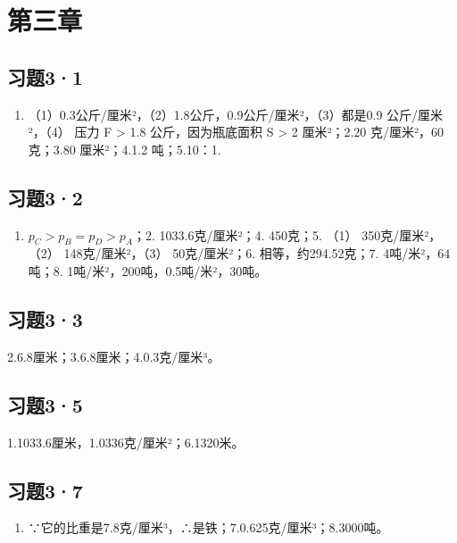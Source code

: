 \section{第三章}\label{ux7b2cux4e09ux7ae0}

\subsection{习题3·1}\label{ux4e60ux989831-1}

\begin{enumerate}
\def\labelenumi{\arabic{enumi}.}
\tightlist
\item
  （1）0.3公斤/厘米²，（2）1.8公斤，0.9公斤/厘米²，（3）都是0.9
  公斤/厘米²，（4） 压力 F \textgreater{} 1.8 公斤，因为瓶底面积 S
  \textgreater{} 2 厘米²；2.20 克/厘米²，60 克；3.80 厘米²；4.1.2
  吨；5.10：1.
\end{enumerate}

\subsection{习题3·2}\label{ux4e60ux989832-1}

\begin{enumerate}
\def\labelenumi{\arabic{enumi}.}
\tightlist
\item
  \(p_C > p_B = p_D > p_A\)；2. 1033.6克/厘米²；4. 450克；5. （1）
  350克/厘米²，（2） 148克/厘米²，（3） 50克/厘米²；6.
  相等，约294.52克；7. 4吨/米²，64吨；8.
  1吨/米²，200吨，0.5吨/米²，30吨。
\end{enumerate}

\subsection{习题3·3}\label{ux4e60ux989833-1}

2.6.8厘米；3.6.8厘米；4.0.3克/厘米³。

\subsection{习题3·5}\label{ux4e60ux989835-1}

1.1033.6厘米，1.0336克/厘米²；6.1320米。

\subsection{习题3·7}\label{ux4e60ux989837-1}

\begin{enumerate}
\def\labelenumi{\arabic{enumi}.}
\setcounter{enumi}{5}
\tightlist
\item
  ∵它的比重是7.8克/厘米³，∴是铁；7.0.625克/厘米³；8.3000吨。
\end{enumerate}

